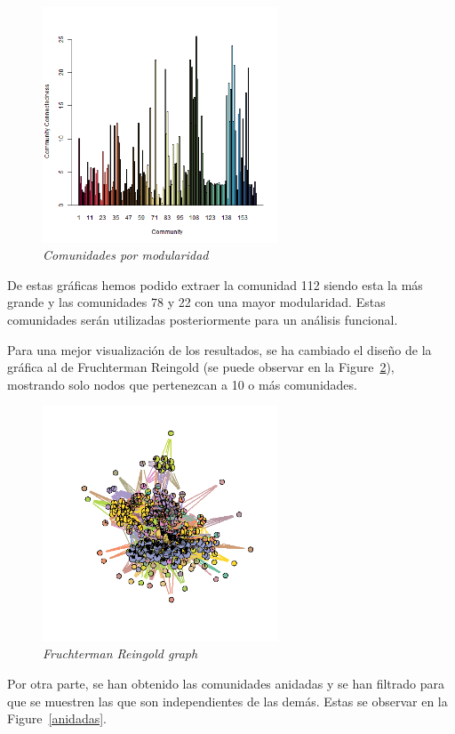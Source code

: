 \begin{figure}[h]
	\centering
	\includegraphics[width=70mm,scale=1.2]{figures/clusters_modularity.png}
	\caption{\textit{Comunidades por modularidad}}
	\label{comModularidad}
\end{figure}

De estas gráficas hemos podido extraer la comunidad 112 siendo esta la más grande y las comunidades 78 y 22 con una mayor modularidad. Estas comunidades serán utilizadas posteriormente para un análisis funcional.

Para una mejor visualización de los resultados, se ha cambiado el diseño de la gráfica al de Fruchterman Reingold (se puede observar en la Figure~\ref{FRg}), mostrando solo nodos que pertenezcan a 10 o más comunidades.

\begin{figure}[h]
	\centering
	\includegraphics[width=70mm,scale=1.2]{figures/hits.network_layout_fruchterman.reingold_shownodesin_10.png}
	\caption{\textit{Fruchterman Reingold graph}}
	\label{FRg}
\end{figure}

Por otra parte, se han obtenido las comunidades anidadas y se han filtrado para que se muestren las que son independientes de las demás. Estas se observar en la Figure~\ref{anidadas}.

